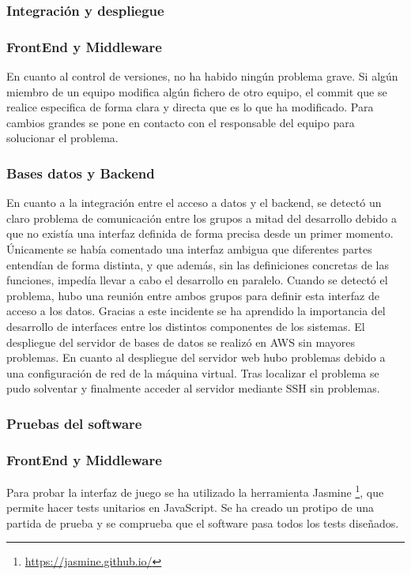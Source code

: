 \subsubsection*{Integración y despliegue}
\subsubsection*{FrontEnd y Middleware}
En cuanto al control de versiones, no ha habido ningún problema grave. Si algún miembro de un equipo modifica algún fichero de otro equipo, el commit que se realice especifica de forma clara y directa que es lo que ha modificado. Para cambios grandes se pone en contacto con el responsable del equipo para solucionar el problema.
\subsubsection*{Bases datos y Backend}
En cuanto a la integración entre el acceso a datos y el backend, se detectó un claro problema de comunicación entre los grupos a mitad del desarrollo debido a que no existía una interfaz definida de forma precisa desde un primer momento. Únicamente se había comentado una interfaz ambigua que diferentes partes entendían de forma distinta, y que además, sin las definiciones concretas de las funciones, impedía llevar a cabo el desarrollo en paralelo. Cuando se detectó el problema, hubo una reunión entre ambos grupos para definir esta interfaz de acceso a los datos. Gracias a este incidente se ha aprendido la importancia del desarrollo de interfaces entre los distintos componentes de los sistemas.
El despliegue del servidor de bases de datos se realizó en AWS sin mayores problemas. En cuanto al despliegue del servidor web hubo problemas debido a una configuración de red de la máquina virtual. Tras localizar el problema se pudo solventar y finalmente acceder al servidor mediante SSH sin problemas.
\subsubsection{Pruebas del software}
\subsubsection*{FrontEnd y Middleware}
Para probar la interfaz de juego se ha utilizado la herramienta Jasmine \footnote{ \url{https://jasmine.github.io/} }, que permite hacer tests unitarios en JavaScript. Se ha creado un protipo de una partida de prueba y se comprueba que el software pasa todos los tests diseñados.

